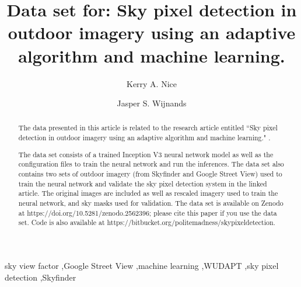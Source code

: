 \documentclass[final,3p,times,authoryear]{elsarticle}
\begin{document}
\begin{frontmatter}



\title{Data set for: Sky pixel detection in outdoor imagery using an adaptive algorithm and machine learning.} 

\author[melb]{Kerry A. Nice}
\author[melb]{Jasper S. Wijnands}
\address[melb]{Transport, Health and Urban Design, Melbourne School of Design, The University of Melbourne, Parkville VIC 3010, Australia}





\begin{abstract}

The data presented in this article is related to the research article entitled ``Sky pixel detection in outdoor imagery using an adaptive algorithm and machine learning." \citep{Nice2019UC}. 

The data set consists of a trained Inception V3 neural network model as well as the configuration files to train the neural network and run the inferences. The data set also contains two sets of outdoor imagery (from Skyfinder and Google Street View) used to train the neural network and validate the sky pixel detection system in the linked article. The original images are included as well as rescaled imagery used to train the neural network, and sky masks used for validation. The data set is available on Zenodo at https://doi.org/10.5281/zenodo.2562396; please cite this paper if you use the data set. Code is also available at https://bitbucket.org/politemadness/skypixeldetection.


\end{abstract}

\begin{keyword}
sky view factor \sep Google Street View \sep machine learning \sep WUDAPT \sep sky pixel detection \sep Skyfinder
\end{keyword}

\end{frontmatter}
\end{document}
